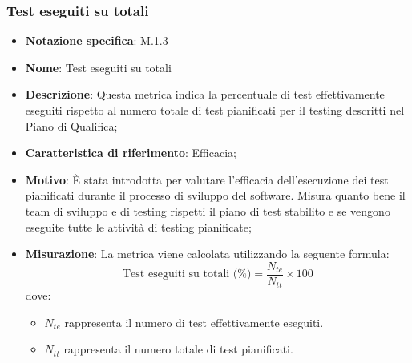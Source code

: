 \subsubsection{Test eseguiti su totali}
\begin{itemize}
    \item \textbf{Notazione specifica}: M.1.3
    \item \textbf{Nome}: Test eseguiti su totali
    \item \textbf{Descrizione}: Questa metrica indica la percentuale di test effettivamente eseguiti rispetto al numero totale di test pianificati per il testing descritti nel Piano di Qualifica;
    \item \textbf{Caratteristica di riferimento}: Efficacia;
    \item \textbf{Motivo}: È stata introdotta per valutare l'efficacia dell'esecuzione dei test pianificati durante il processo di sviluppo del software. Misura quanto bene il team di sviluppo e di testing rispetti il piano di test stabilito e se vengono eseguite tutte le attività di testing pianificate;
    \item \textbf{Misurazione}: La metrica viene calcolata utilizzando la seguente formula:
    \[
    \text{Test eseguiti su totali (\%)} = \frac{N_{te}}{N_{tt}} \times 100
    \]
    dove:
    \begin{itemize}
        \item $N_{te}$ rappresenta il numero di test effettivamente eseguiti.
        \item $N_{tt}$ rappresenta il numero totale di test pianificati.
    \end{itemize}

\end{itemize}
